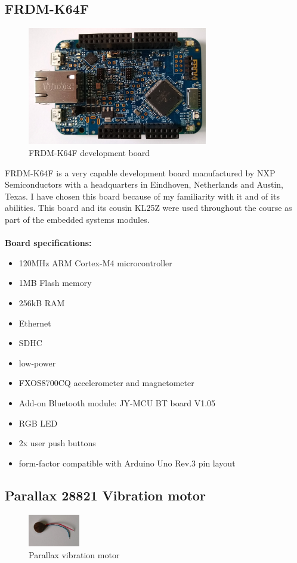 \documentclass[12pt,a4paper]{article}
\begin{document}
		\subsection{FRDM-K64F}
		\begin{figure}[h]
			\centering
			\includegraphics[width=0.7\textwidth]{k64f1.jpg}\par\vspace{0cm}
			\caption{FRDM-K64F development board}
		\end{figure}
		FRDM-K64F is a very capable development board manufactured by NXP Semiconductors with a 
		headquarters in Eindhoven, Netherlands and Austin, Texas. I have chosen this board because  
		of my familiarity with it and of its abilities. This board and its cousin KL25Z were used  
		throughout the course as part of the embedded systems modules.\\  	
		\\
		{\bfseries Board specifications:}  	
		\begin{itemize}[topsep=4pt,itemsep=1pt]
			\item 120MHz ARM Cortex-M4 microcontroller
			\item 1MB Flash memory
			\item 256kB RAM
			\item Ethernet
			\item SDHC
			\item low-power
			\item FXOS8700CQ accelerometer and magnetometer 
			\item Add-on Bluetooth module: JY-MCU BT board V1.05
			\item RGB LED
			\item 2x user push buttons
			\item form-factor compatible with Arduino Uno Rev.3 pin layout
		\end{itemize}
		
		\subsection{Parallax 28821 Vibration motor}	
		\begin{figure}
			\centering
			\includegraphics[width=0.2\textwidth]{parallax_vib_mot1.jpg}
			\caption{Parallax vibration motor}
		\end{figure}
		
\end{document}
